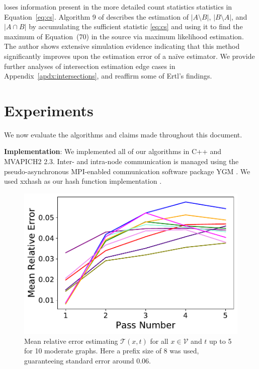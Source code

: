 \documentclass{vldb}
\begin{document}
loses information present in the more detailed count statistics statistics in Equation~\eqref{eq:cs}.
Algorithm 9 of \cite{ertl2017new} describes the estimation of $|A \setminus B|$, $|B \setminus A|$, and $|A \cap B|$ by accumulating the sufficient statistic \eqref{eq:cs} and using it to find the maximum of Equation~(70) in the source via maximum likelihood estimation.
The author shows extensive simulation evidence indicating that this method significantly improves upon the estimation error of a na\"ive estimator.
We provide further analyses of intersection estimation edge cases in Appendix~\ref{apdx:intersections}, and reaffirm some of Ertl's findings.



\section{Experiments}
 \label{sec:experiments}

We now evaluate the algorithms and claims made throughout this document.

\noindent
\textbf{Implementation}:
We implemented all of our algorithms in C++ and MVAPICH2 2.3. 
Inter- and intra-node communication is managed using the pseudo-asynchronous MPI-enabled communication software package YGM \cite{priest2019you}.
We used xxhash as our hash function implementation \cite{xxhash}. 


\begin{figure}
\centering
\includegraphics[width=0.7\columnwidth]{nbhd_eval}
\caption{Mean relative error estimating $\mathcal{T}(x, t)$ for all $x \in \mathcal{V}$ and $t$ up to 5 for 10 moderate graphs.
	Here a prefix size of 8 was used, guaranteeing standard error around 0.06.
}
\label{fig:nbhd}
\end{figure}
\end{document}
